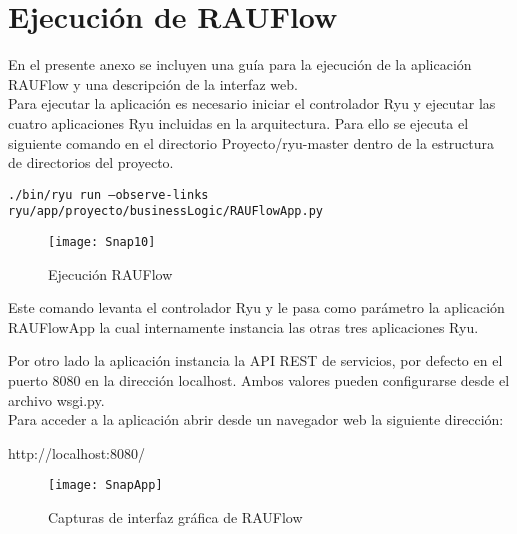 
\chapter{Ejecuci\'on de RAUFlow}
\label{appendix5}

\ifpdf
    \graphicspath{{Appendix5/Figs/Raster/}{Appendix5/Figs/PDF/}{Appendix5/Figs/}}
\else
    \graphicspath{{Appendix5/Figs/Vector/}{Appendix5/Figs/}}
\fi

En el presente anexo se incluyen una guía para la ejecuci\'on de la aplicaci\'on RAUFlow y una descripción de la interfaz web.\\

Para ejecutar la aplicaci\'on es necesario iniciar el controlador Ryu y ejecutar las cuatro aplicaciones Ryu incluidas en la arquitectura. Para ello se ejecuta el siguiente comando en el directorio Proyecto/ryu-master dentro de la estructura de directorios del proyecto.

\begin{center}
\texttt{./bin/ryu run --observe-links ryu/app/proyecto/businessLogic/RAUFlowApp.py}
\end{center}

\begin{figure}[h] 
\centering    
\texttt{[image: Snap10]}
\caption[Ejecuci\'on RAUFlow]{Ejecuci\'on RAUFlow}
\label{fig:Img2}
\end{figure}

Este comando levanta el controlador Ryu y le pasa como parámetro la aplicaci\'on RAUFlowApp la cual internamente instancia las otras tres aplicaciones Ryu.

Por otro lado la aplicaci\'on instancia la API REST de servicios, por defecto en el puerto 8080 en la direcci\'on localhost. Ambos valores pueden configurarse desde el archivo wsgi.py.\\

Para acceder a la aplicaci\'on abrir desde un navegador web la siguiente direcci\'on:

\begin{center}
http://localhost:8080/
\end{center}


\begin{figure}[ht!] 
\centering    
\texttt{[image: SnapApp]}
\caption[Capturas de interfaz gráfica de RAUFlow]{Capturas de interfaz gráfica de RAUFlow}
\label{fig:Img2}
\end{figure}